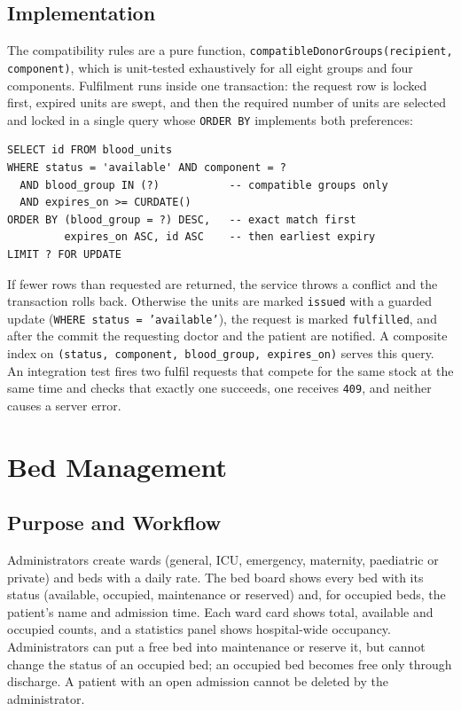 \subsection{Implementation}

The compatibility rules are a pure function, \texttt{compatibleDonorGroups(recipient, component)}, which is unit-tested exhaustively for all eight groups and four components. Fulfilment runs inside one transaction: the request row is locked first, expired units are swept, and then the required number of units are selected and locked in a single query whose \texttt{ORDER BY} implements both preferences:

\begin{lstlisting}[language=SQLx, caption=Exact-Group-First FEFO Unit Selection (bloodBankService.js)]
SELECT id FROM blood_units
WHERE status = 'available' AND component = ?
  AND blood_group IN (?)           -- compatible groups only
  AND expires_on >= CURDATE()
ORDER BY (blood_group = ?) DESC,   -- exact match first
         expires_on ASC, id ASC    -- then earliest expiry
LIMIT ? FOR UPDATE
\end{lstlisting}

If fewer rows than requested are returned, the service throws a conflict and the transaction rolls back. Otherwise the units are marked \texttt{issued} with a guarded update (\texttt{WHERE status = 'available'}), the request is marked \texttt{fulfilled}, and after the commit the requesting doctor and the patient are notified. A composite index on \texttt{(status, component, blood\_group, expires\_on)} serves this query. An integration test fires two fulfil requests that compete for the same stock at the same time and checks that exactly one succeeds, one receives \texttt{409}, and neither causes a server error.

\FloatBarrier
\section{Bed Management}
\label{sec:mod-beds}

\subsection{Purpose and Workflow}

Administrators create wards (general, ICU, emergency, maternity, paediatric or private) and beds with a daily rate. The bed board shows every bed with its status (available, occupied, maintenance or reserved) and, for occupied beds, the patient's name and admission time. Each ward card shows total, available and occupied counts, and a statistics panel shows hospital-wide occupancy. Administrators can put a free bed into maintenance or reserve it, but cannot change the status of an occupied bed; an occupied bed becomes free only through discharge. A patient with an open admission cannot be deleted by the administrator.

